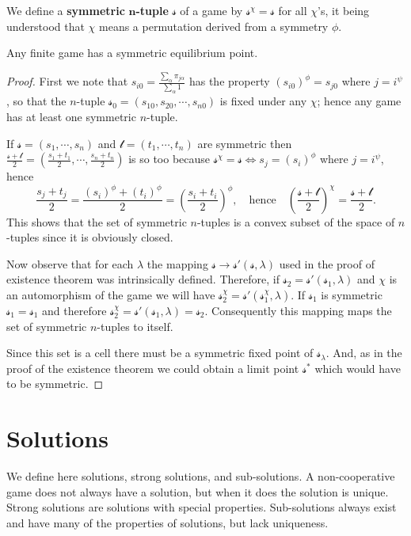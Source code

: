 We define a \textbf{symmetric} $\mathbf n$\textbf{-tuple} $\mathcal{s} $ of a game by $\mathcal{s} ^{\chi}=\mathcal{s} $ for all $\chi$'s, it being understood that $\chi$ means a permutation derived from a symmetry $\phi$.
\begin{theorem}
    Any finite game has a symmetric equilibrium point.
\end{theorem}
\begin{proof}
    First we note that $s_{i0}=\frac{\sum_{\alpha }^{} \pi_{j\alpha }}{\sum_{\alpha }^{} 1}$ has the property $\left( s_{i0} \right) ^{\phi}=s_{j0}$ where $j=i^{\psi}$, so that the $n$-tuple $\mathcal{s}_0=(s_{10},s_{20},\cdots ,s_{n0})$ is fixed under any $\chi$; hence any game has at least one symmetric $n$-tuple. 

    If $\mathcal{s} =(s_1,\cdots ,s_n )$ and $\mathcal{t} =(t_1,\cdots ,t_n )$ are symmetric then $\frac{\mathcal{s} +\mathcal{t} }{2}=\left( \frac{s_1+t_1}{2},\cdots ,\frac{s_n +t_n }{2} \right) $ is so too because $\mathcal{s} ^{\chi}=\mathcal{s} \iff s_j =(s_i )^{\phi}$ where $j=i^{\psi}$, hence \[
            \frac{s_j +t_j }{2}=\frac{(s_i )^{\phi}+(t_i )^{\phi}}{2}=\left( \frac{s_i +t_i }{2} \right) ^{\phi}, \quad \text{hence} \quad \left( \frac{\mathcal{s} +\mathcal{t} }{2} \right) ^{\chi}=\frac{\mathcal{s} +\mathcal{t} }{2}.
    \] This shows that the set of symmetric $n$-tuples is a convex subset of the space of $n$-tuples since it is obviously closed.

    Now observe that for each $\lambda$ the mapping $\mathcal{s} \to \mathcal{s} '(\mathcal{s} , \lambda)$ used in the proof of existence theorem was intrinsically defined. Therefore, if $\mathcal{s}_2=\mathcal{s} '(\mathcal{s} _1,\lambda)$ and $\chi$ is an automorphism of the game we will have $\mathcal{s} _2^{\chi}=\mathcal{s} '(\mathcal{s} _1^{\chi},\lambda)$. If $\mathcal{s} _1$ is symmetric $\mathcal{s} _1=\mathcal{s} _1$ and therefore $\mathcal{s} _2^{\chi}=\mathcal{s} '(\mathcal{s} _1,\lambda)=\mathcal{s} _2$. Consequently this mapping maps the set of symmetric $n$-tuples to itself. 

    Since this set is a cell there must be a symmetric fixed point of $\mathcal{s} _{\lambda}$. And, as in the proof of the existence theorem we could obtain a limit point $\mathcal{s} ^*$ which would have to be symmetric.
\end{proof}
\section{Solutions}
\hspace{\parindent}We define here solutions, strong solutions, and sub-solutions. A non-cooperative game does not always have a solution, but when it does the solution is unique. Strong solutions are solutions with special properties. Sub-solutions always exist and have many of the properties of solutions, but lack uniqueness.

